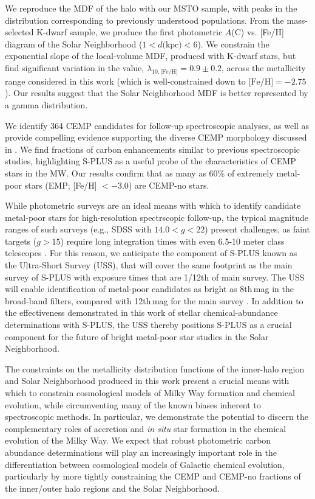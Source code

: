 \documentclass[twocolumn,trackchanges]{aastex63}
\begin{document}
We reproduce the MDF of the halo with our MSTO sample, with peaks in the distribution corresponding to previously understood populations.  From the mass-selected K-dwarf sample, we produce the first photometric $A$(C) vs. [Fe/H] diagram of the Solar Neighborhood ($1 < d\textrm{(kpc)} < 6$). We constrain the exponential slope of the local-volume MDF, produced with K-dwarf stars, but find significant variation in the value, $\lambda_{10, \textrm{[Fe/H]}} = 0.9\pm0.2$, across the metallicity range considered in this work (which is well-constrained down to $\textrm{[Fe/H]}=-2.75$). Our results suggest that the Solar Neighborhood MDF is better represented by a gamma distribution.

We identify 364 CEMP candidates for follow-up spectroscopic analyses, as well as provide compelling evidence supporting the diverse CEMP morphology discussed in \citet{Yoon:2016}. We find fractions of carbon enhancements similar to previous spectroscopic studies, highlighting S-PLUS as a useful probe of the characteristics of CEMP stars in the MW. Our results confirm that as many as 60\% of extremely metal-poor stars (EMP; [Fe/H] $<-3.0$) are CEMP-no stars. 


While photometric surveys are an ideal means with which to identify candidate metal-poor stars for high-resolution spectrscopic follow-up, the typical magnitude ranges of such surveys (e.g., SDSS with $14.0 < g < 22$) present challenges, as faint targets ($g > 15$) require long integration times with even 6.5-10 meter class telescopes \citep{Mendes:2019}. For this reason, we anticipate the component of S-PLUS known as the Ultra-Short Survey (USS), that will cover the same footprint as the main survey of S-PLUS with exposure times that are 1/12th of main survey. The USS will enable identification of metal-poor candidates as bright as 8th\,mag in the broad-band filters, compared with 12th\,mag for the main survey \citep[see][for details]{Mendes:2019}. In addition to the effectiveness demonstrated in this work of stellar chemical-abundance determinations with S-PLUS, the USS thereby positions S-PLUS as a crucial component for the future of bright metal-poor star studies in the Solar Neighborhood.

The constraints on the metallicity distribution functions of the inner-halo region and Solar Neighborhood produced in this work present a crucial means with which to constrain cosmological models of Milky Way formation and chemical evolution, while circumventing many of the known biases inherent to spectroscopic methods. In particular, we demonstrate the potential to discern the complementary roles of accretion and \textit{in situ} star formation in the chemical evolution of the Milky Way. We expect that robust photometric carbon abundance determinations will play an increasingly important role in the differentiation between cosmological models of Galactic chemical evolution, particularly by more tightly constraining the CEMP and CEMP-no fractions of the inner/outer halo regions and the Solar Neighborhood.
\end{document}
